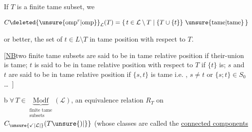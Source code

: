 


If $T$ is a finite
tame subset\unsure{,|;}, we  

\[
 C\deleted{\unsure{\mathrm{omp}^{r}|\mathrm{omp}}}_{\mathcal L}(T)=
 \{\,t\in\mathcal L\setminus T\mid \{T\cup\{t\}\}\ \text{\unsure{tame|tame}}\,\}
\]


or better, the set of $t\in L\setminus T$ in
tame position with respect to $T$.

[\uline{NB}\quad two finite tame subsets
are said to be in tame relative
position if their-union is
tame; $t$ is said to be in tame relative
position with respect to $T$ if $\{t\}$ is;
$s$ and $t$ are said to be in tame relative position
if $\{s,t\}$ is tame i.e. ,
$s\ne t$ or $\{s;t\}\in S_0$ \ldots\ ]


\textcircled{\scriptsize b}\quad $\forall\,T\in\underbrace{\mathrm{Modf}}_{\substack{\text{finite tame}\\\text{subsets}}}(\mathcal L)$, an equivalence
relation $R_T$ on $C_{\unsure{\checkmark|\mathcal L|}}(T\unsure{)|\}}$ (whose
classes are called the \uline{connected components} 


